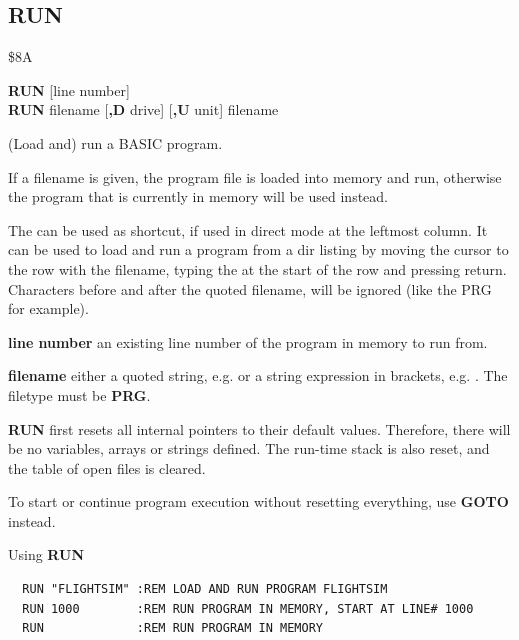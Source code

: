
\newpage
\subsection{RUN}
\begin{description}[leftmargin=2cm,style=nextline]
\item [Token:] \$8A
\item [Format:] {\bf RUN} [line number] \\
                {\bf RUN} filename [{\bf,D} drive] [{\bf,U} unit]
                {\bf \screentext{$\uparrow$}} filename
\item [Usage:] (Load and) run a BASIC program.

   If a filename is given, the program file is loaded into
   memory and run, otherwise the program that is currently in memory
   will be used instead.

   The {\bf \screentext{$\uparrow$}} can be used as shortcut, if used
   in direct mode at the leftmost column. It can be used to load and run
   a program from a dir listing by moving the cursor to the
   row with the filename, typing the {\bf \screentext{$\uparrow$}} at the
   start of the row and pressing return. Characters before and after the
   quoted filename, will be ignored (like the PRG for example).

   {\bf line number} an existing line number of the program in memory to run from.

   {\bf filename} either a quoted string, e.g.  or
   a string expression in brackets, e.g. .
   The filetype must be {\bf PRG}.

   \drivedefinition

   \unitdefinition

   {\bf RUN} first resets all internal pointers to their
   default values. Therefore, there will be no variables, arrays
   or strings defined. The run-time stack is also reset, and the
   table of open files is cleared.

\item [Remarks:]
   To start or continue program execution without
   resetting everything, use {\bf GOTO} instead.

\item [Examples:] Using {\bf RUN}
\begin{tcolorbox}[colback=black,coltext=white]
\verbatimfont{\codefont}
\begin{verbatim}
  RUN "FLIGHTSIM" :REM LOAD AND RUN PROGRAM FLIGHTSIM
  RUN 1000        :REM RUN PROGRAM IN MEMORY, START AT LINE# 1000
  RUN             :REM RUN PROGRAM IN MEMORY
\end{verbatim}
\end{tcolorbox}
\end{description}




